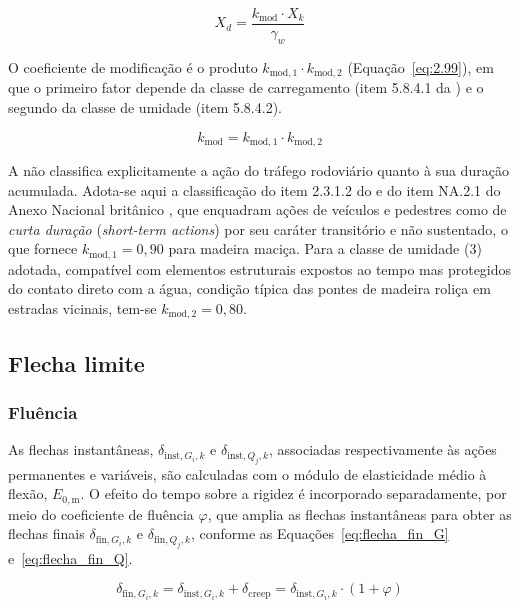 \begin{equation}
    X_d = \frac{k_{\mathrm{mod}} \cdot X_k}{\gamma_w}
\label{eq:2.099}
\end{equation}

O coeficiente de modificação é o produto $k_{\mathrm{mod},1}\cdot k_{\mathrm{mod},2}$ (Equação~\eqref{eq:2.99}), em que o primeiro fator depende da classe de carregamento (item 5.8.4.1 da \textcite{NBR7190-1:2022}) e o segundo da classe de umidade (item 5.8.4.2).

\begin{equation}
k_{\mathrm{mod}} = k_{\mathrm{mod},1} \cdot k_{\mathrm{mod},2}
\label{eq:2.99}
\end{equation}

A \textcite{NBR7190-1:2022} não classifica explicitamente a ação do tráfego rodoviário quanto à sua duração acumulada. Adota-se aqui a classificação do item 2.3.1.2 do \textcite{EN1995-2:2004} e do item NA.2.1 do Anexo Nacional britânico \textcite{BSNA-EN1995-2:2004}, que enquadram ações de veículos e pedestres como de \emph{curta duração} (\textit{short-term actions}) por seu caráter transitório e não sustentado, o que fornece $k_{\mathrm{mod},1} = 0{,}90$ para madeira maciça.
Para a classe de umidade (3) adotada, compatível com elementos estruturais expostos ao tempo mas protegidos do contato direto com a água, condição típica das pontes de madeira roliça em estradas vicinais, tem-se $k_{\mathrm{mod},2} = 0{,}80$.

\subsection{Flecha limite}\label{sec:flecha_limite}

\subsubsection{Fluência}

As flechas instantâneas, $\delta_{\mathrm{inst},G_i,k}$ e $\delta_{\mathrm{inst},Q_j,k}$, associadas respectivamente às ações permanentes e variáveis, são calculadas com o módulo de elasticidade médio à flexão, $E_{0,\mathrm{m}}$. O efeito do tempo sobre a rigidez é incorporado separadamente, por meio do coeficiente de fluência $\varphi$, que amplia as flechas instantâneas para obter as flechas finais $\delta_{\mathrm{fin},G_i,k}$ e $\delta_{\mathrm{fin},Q_j,k}$, conforme as Equações~\eqref{eq:flecha_fin_G} e~\eqref{eq:flecha_fin_Q}.

\begin{equation}
\delta_{\mathrm{fin},G_i,k}
=
\delta_{\mathrm{inst},G_i,k}
+ \delta_{\mathrm{creep}}
=
\delta_{\mathrm{inst},G_i,k} \cdot (1 + \varphi)
\label{eq:flecha_fin_G}
\end{equation}

